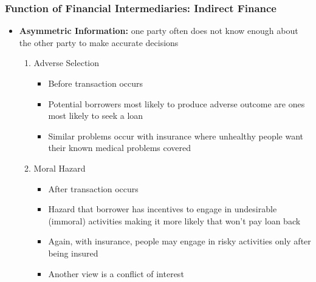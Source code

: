 \documentclass{beamer}
\begin{document}
\begin{frame}
\frametitle{Function of Financial Intermediaries: Indirect Finance }
\begin{itemize}
\item \textbf{Asymmetric Information:} one party often does not know enough about the other party to make accurate decisions
\begin{enumerate}
\item Adverse Selection
\begin{itemize}
\item Before transaction occurs
\item Potential borrowers most likely to produce adverse outcome are ones most likely to seek a loan
\item Similar problems occur with insurance where unhealthy people want their known medical problems covered
\end{itemize}


\item Moral Hazard

\begin{itemize}
\item After transaction occurs
\item Hazard that borrower has incentives to engage in undesirable (immoral) activities making it more likely that won't pay loan back
\item Again, with insurance, people may engage in risky activities only after being insured
\item Another view is a conflict of interest
\end{itemize}

\end{enumerate}

\end{itemize}
\end{frame}





\end{document}
